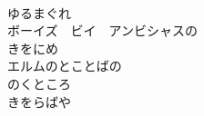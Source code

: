 \documentclass[10pt,b5j]{tarticle} %
\begin{document}
\begin{enumerate}
\begin{minipage}[c]{\blocksize}
    \end{minipage}
    \begin{minipage}[c]{\blocksize}
        
        \vspace{\linespace}
        \item~\\
        ゆるまぐれ\\
        ボーイズ　ビイ　アンビシャスの\\
        きをにめ\\
        エルムのとことばの\\
        のくところ\\
        きをらばや
    
    \end{minipage}
\end{enumerate} %
\end{document}
